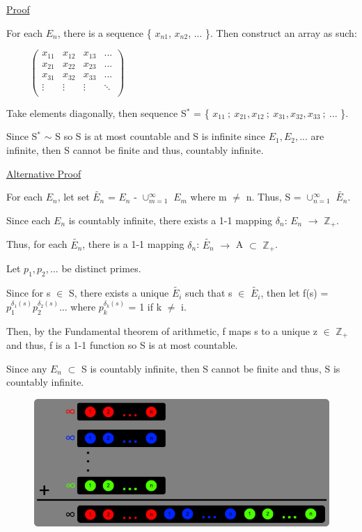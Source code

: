 { \color{magenta} \underline{Proof} } 
	
	For each $E_n$, there is a sequence \{ $x_{n1}$, $x_{n2}$, ... \}.
	Then construct an array as such:

	$ \hspace{1cm}
	\left(
	\begin{array}{cccc}
		x_{11} & x_{12} & x_{13} & ... \\
		x_{21} & x_{22} & x_{23} & ... \\
		x_{31} & x_{32} & x_{33} & ... \\
		\vdots & \vdots & \vdots & \ddots \\
	\end{array}
	\right)
	$
		
	Take elements diagonally, then sequence S$^*$ =
	\{ $x_{11} \ ; \ x_{21}, x_{12} \ ; \ x_{31}, x_{32}, x_{33} \ ; \ ... $ \}.
		
	\begin{adjustbox}{minipage=15cm, right, vspace=0.1cm 0cm}
		Since S$^*$ $\sim$ S so S is at most countable and S is infinite since
		$E_1, E_2, ...$ are infinite, then S cannot be finite and thus, countably infinite.
	\end{adjustbox}

{ \color{magenta} \underline{Alternative Proof} } 

	For each $E_n$, let set $\widetilde{E_n}$ = $E_n$ - $\cup_{m=1}^{\infty}$ $E_m$ where
	m $\neq$ n. Thus, S = $\cup_{n=1}^{\infty}$ $\widetilde{E_n}$.

	Since each $E_n$ is countably infinite, there exists a 1-1 mapping
	$\delta_n$: $E_n$ $\rightarrow$ $\mathbb{Z}_+$.

	Thus, for each $\widetilde{E_n}$, there is a 1-1 mapping
	$\delta_n$: $\widetilde{E_n}$ $\rightarrow$ A $\subset$ $\mathbb{Z}_+$.

	Let $p_1, p_2, ... $ be distinct primes.

	Since for s $\in$ S, there exists a unique $\widetilde{E_i}$ such that
	s $\in$ $\widetilde{E_i}$, then let f(s) = $p_1^{\delta_1(s)} p_2^{\delta_2(s)}...$
	where $p_k^{\delta_k(s)}$ = 1 if k $\neq$ i.

	Then, by the Fundamental theorem of arithmetic, f maps s to a unique z $\in$ $\mathbb{Z}_+$
	and thus, f is a 1-1 function so S is at most countable.

	Since any $E_n$ $\subset$ S is countably infinite, then S cannot be finite
	and thus, S is countably infinite.

\begin{figure}[h]
	\centering
	\includegraphics[scale=0.5]{Images/5.1.2.png}
\end{figure}

